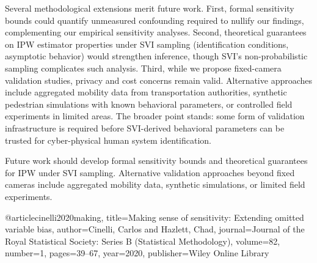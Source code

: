 

Several methodological extensions merit future work. First, formal sensitivity bounds \citep{cinelli2020making, rosenbaum2002observational} could quantify unmeasured confounding required to nullify our findings, complementing our empirical sensitivity analyses. Second, theoretical guarantees on IPW estimator properties under SVI sampling (identification conditions, asymptotic behavior) would strengthen inference, though SVI's non-probabilistic sampling complicates such analysis. Third, while we propose fixed-camera validation studies, privacy and cost concerns remain valid. Alternative approaches include aggregated mobility data from transportation authorities, synthetic pedestrian simulations with known behavioral parameters, or controlled field experiments in limited areas. The broader point stands: some form of validation infrastructure is required before SVI-derived behavioral parameters can be trusted for cyber-physical human system identification.



Future work should develop formal sensitivity bounds \citep{cinelli2020making} and theoretical guarantees for IPW under SVI sampling. Alternative validation approaches beyond fixed cameras include aggregated mobility data, synthetic simulations, or limited field experiments.




@article{cinelli2020making,
  title={Making sense of sensitivity: Extending omitted variable bias},
  author={Cinelli, Carlos and Hazlett, Chad},
  journal={Journal of the Royal Statistical Society: Series B (Statistical Methodology)},
  volume={82},
  number={1},
  pages={39--67},
  year={2020},
  publisher={Wiley Online Library}
}

